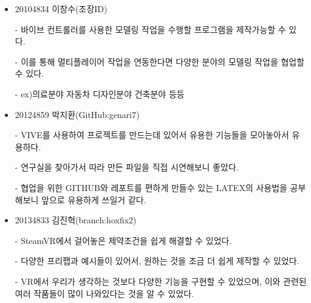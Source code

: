 \documentclass{report}
\begin{document}
    \begin{itemize}
    
    \item {20104834 이창수(조장ID)}
    \item [ -]바이브 컨트롤러를 사용한 모델링 작업을 수행할 프로그램을 제작가능할 수 있다.
    \item [ -]이를 통해 멀티플레이어 작업을 연동한다면 다양한 분야의 모델링 작업을 협업할 수 있다.
    \item [ -]ex)의료분야 자동차 디자인분야 건축분야 등등

    
    \item {20124859 박지환(GitHub:genari7)}
    \item [ -]VIVE를 사용하여 프로젝트를 만드는데 있어서 유용한 기능들을 모아놓아서 유용하다.
    \item [ -]연구실을 찾아가서 따라 만든 파일을 직접 시연해보니 좋았다.
    \item [ -]협업을 위한 GITHUB와 레포트를 편하게 만들수 있는 LATEX의 사용법을 공부해보니 앞으로 유용하게 쓰일거 같다.
    
    \item {20134833 김진혁(branch:hoxfix2)}
    \item [ -]SteamVR에서 걸어놓은 제약조건을 쉽게 해결할 수 있었다.
    \item [ -]다양한 프리팹과 예시들이 있어서, 원하는 것을 조금 더 쉽게 제작할 수 있었다.
    \item [ -]VR에서 우리가 생각하는 것보다 다양한 기능을 구현할 수 있었으며, 이와 관련된 여러 작품들이 많이 나와있다는 것을 알 수 있었다.

    \end{itemize}

    
\end{document}

